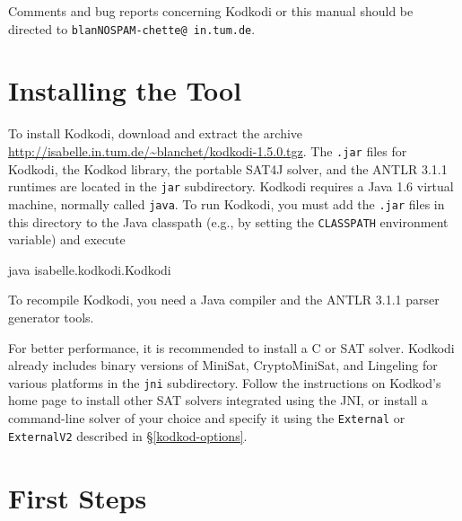 \documentclass[a4paper,12pt]{article}
\begin{document}
Comments and bug reports concerning Kodkodi or this manual should be directed to
\texttt{blan{\color{white}NOSPAM}\kern-\wd\boxA{}chette@\allowbreak
in.\allowbreak tum.\allowbreak de}.

%

\section{Installing the Tool}
\label{installing-the-tool}

To install Kodkodi, download and extract the archive
\url{http://isabelle.in.tum.de/~blanchet/kodkodi-1.5.0.tgz}. The \texttt{.jar}
files for Kodkodi, the Kodkod library, the portable SAT4J solver, and the ANTLR
3.1.1 runtimes are located in the \texttt{jar} subdirectory. Kodkodi
requires a Java 1.6 virtual machine, normally called \texttt{java}. To run
Kodkodi, you must add the \texttt{.jar} files in this directory to the Java
classpath (e.g., by setting the \texttt{CLASSPATH} environment variable) and
execute

\pre
\ttfamily\small java isabelle.kodkodi.Kodkodi
\post

To recompile Kodkodi, you need a Java compiler and the ANTLR 3.1.1 parser
generator tools.

For better performance, it is recommended to install a C or \cpp{} SAT solver.
Kodkodi already includes binary versions of MiniSat, CryptoMiniSat, and
Lingeling for various platforms in the \texttt{jni} subdirectory. Follow the
instructions on Kodkod's home page \cite{kodkod-2009} to install other SAT
solvers integrated using the JNI, or install a command-line solver of your
choice and specify it using the \texttt{External} or \texttt{ExternalV2}
described in \S\ref{kodkod-options}.

\section{First Steps}
\label{first-steps}
\end{document}
